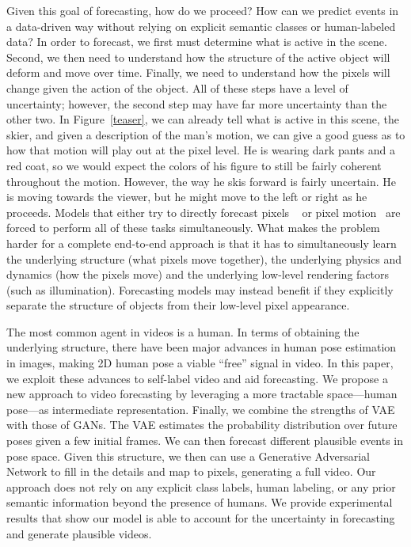 Given this goal of forecasting, how do we proceed? How can we predict events in a data-driven way without relying on explicit semantic classes or human-labeled data? In order to forecast, we first must determine what is active in the scene. Second, we then need to understand how the structure of the active object will deform and move over time. Finally, 
we need to understand how the pixels will change given the action of the object. All of these steps have a level of uncertainty; however, the second step may have far more uncertainty than the other two. In Figure~\ref{teaser}, we can already tell what is active in this scene, the skier, and given a description of the man's motion, we can give a good guess as to how that motion will play out at the pixel level. He is wearing dark pants and a red coat, so we would expect the colors of his figure to still be fairly coherent throughout the motion. However, the way he skis forward is fairly uncertain. He is moving towards the viewer, but he might move to the left or right as he proceeds. Models that either try to directly forecast pixels ~\cite{Srivastava15, Ranzato14, Xue16, Vondrick16, Matthieu16} or pixel motion~\cite{Walker15, Walker16, Finn16, Pintea14, Yuen10} are forced to perform all of these tasks simultaneously. What makes the problem harder for a complete end-to-end approach is that it has to simultaneously learn the underlying structure (what pixels move together), the underlying physics and dynamics (how the pixels move) and the underlying low-level rendering factors (such as illumination). Forecasting models may instead benefit if they explicitly separate the structure of objects from their low-level pixel appearance.  

The most common agent in videos is a human. In terms of obtaining the underlying structure, there have been major advances in human pose estimation~\cite{Cao17, Wei16, Chu17, Newell16} in images, making 2D human pose a viable ``free'' signal in video. In this paper, we exploit these advances to self-label video and aid forecasting. We propose a new approach to video forecasting by leveraging a more tractable space---human pose---as intermediate representation. Finally, we combine the strengths of VAE with those of GANs. The VAE estimates the probability distribution over future poses given a few initial frames. We can then forecast different plausible events in pose space. Given this structure, we then can use a Generative Adversarial Network to fill in the details and map to pixels, generating a full video. Our approach does not rely on any explicit class labels, human labeling, or any prior semantic information beyond the presence of humans. We provide experimental results that show our model is able to account for the uncertainty in forecasting and generate plausible videos.
 
